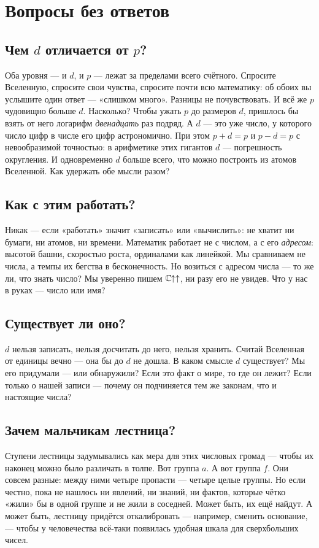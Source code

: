 \section{Вопросы без ответов}

\subsection{Чем \(d\) отличается от \(p\)?}
Оба уровня --- и \(d\), и \(p\) --- лежат за пределами всего счётного. Спросите Вселенную,
спросите свои чувства, спросите почти всю математику: об обоих вы услышите один ответ ---
«слишком много». Разницы не почувствовать. И всё же \(p\) чудовищно больше \(d\).
Насколько? Чтобы ужать \(p\) до размеров \(d\), пришлось бы взять от него логарифм
\emph{двенадцать} раз подряд. А \(d\) --- это уже число, у которого число цифр в числе его
цифр астрономично. При этом \(p+d=p\) и \(p-d=p\) с невообразимой точностью: в арифметике
этих гигантов \(d\) --- погрешность округления. И одновременно \(d\) больше всего, что можно
построить из атомов Вселенной. Как удержать обе мысли разом?

\subsection{Как с этим работать?}
Никак --- если «работать» значит «записать» или «вычислить»: не хватит ни бумаги, ни
атомов, ни времени. Математик работает не с числом, а с его \emph{адресом}: высотой башни,
скоростью роста, ординалами как линейкой. Мы сравниваем не числа, а темпы их бегства в
бесконечность. Но возиться с адресом числа --- то же ли, что знать число? Мы уверенно пишем
\(\mathbb{C}\mkern-1.5mu{\uparrow\uparrow}\), ни разу его не увидев. Что у нас в руках --- число или имя?

\subsection{Существует ли оно?}
\(d\) нельзя записать, нельзя досчитать до него, нельзя хранить. Считай Вселенная от единицы
вечно --- она бы до \(d\) не дошла. В каком смысле \(d\) существует? Мы его придумали --- или
обнаружили? Если это факт о мире, то где он лежит? Если только о нашей записи --- почему он
подчиняется тем же законам, что и настоящие числа?

\subsection{Зачем мальчикам лестница?}
Ступени лестницы задумывались как мера для этих числовых громад --- чтобы их наконец можно было
различать в толпе. Вот группа \(a\). А вот группа \(f\). Они совсем разные: между ними
четыре пропасти --- четыре целые группы. Но если честно, пока не нашлось ни явлений, ни
знаний, ни фактов, которые чётко «жили» бы в одной группе и не жили в соседней. Может быть,
их ещё найдут. А может быть, лестницу придётся откалибровать --- например, сменить
основание, --- чтобы у человечества всё-таки появилась удобная шкала для сверхбольших
чисел.

